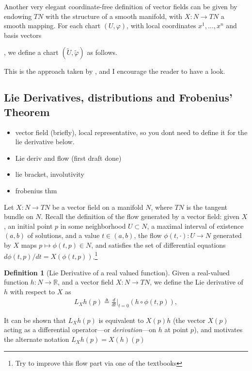 \documentclass[psamsfonts]{amsart}
\theoremstyle{definition}
\newtheorem{defn}[thm]{Definition}
\theoremstyle{remark}
\newcommand*\R{\mathds{R}}
\numberwithin{equation}{section}
\begin{document}
Another very elegant coordinate-free definition of vector fields can be given by endowing $TN$ with the structure of a smooth manifold, with $X:N\rightarrow TN$ a smooth mapping. For each chart $(U, \varphi)$, with local coordinates $x^1, \dots, x^n$ and basis vectors 

, we define a chart $(\tilde U, \tilde \varphi)$ as follows. 


This is the approach taken by \cite{nijmeijer_nonlinear_1990}, and I encourage the reader to have a look. 

\subsection{Lie Derivatives, distributions and Frobenius' Theorem}\label{sec:prelim-frobenius}

{\color{red}
\begin{itemize}
    \item vector field (briefly), local representative, so you dont need to define it for the lie derivative below. 
    \item Lie deriv and flow (first draft done)
    \item lie bracket, involutivity
    \item frobenius thm
\end{itemize}}

Let $X: N \rightarrow TN$ be a vector field on a manifold $N$, where $TN$ is the tangent bundle on $N$. Recall the definition of the flow
generated by a vector field: given $X$, an initial point $p$ in some neighborhood $U\subset N$, a maximal interval of existence $(a, b)$ of solutions, and a value $t\in (a,b)$, the flow $\phi(t, \cdot): U \rightarrow N$ generated by $X$ maps $p \mapsto \phi(t, p)\in N$, and satisfies the set of differential equations $d\phi(t, p)/dt = X(\phi(t, p))$.\footnote{{\color{red} Try to improve this flow part via one of the textbooks}}

\begin{defn}[Lie Derivative of a real valued function]
Given a real-valued function $h: N \rightarrow \R$, and a vector field $X: N\rightarrow TN$, we define the Lie derivative of $h$ with respect to $X$ as
\begin{align}
L_Xh(p) \triangleq \frac{d}{dt}\biggr|_{t=0}\left( h \circ \phi(t, p)  \right), 
\end{align}
\end{defn}
It can be shown that $L_Xh(p)$ is equivalent to $X(p)h$ (the vector $X(p)$ acting as a differential operator---or \textit{derivation}---on $h$ at point $p$), and motivates the alternate notation $L_Xh(p) = X(h)(p)$
\end{document}
